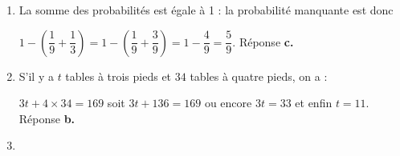 
\medskip

%
 
\begin{enumerate}
\item %



La somme des probabilités est égale à 1  : la probabilité manquante est donc 

$1 - \left(\dfrac{1}{9} + \dfrac{1}{3} \right) = 1 - \left(\dfrac{1}{9} + \dfrac{3}{9} \right) = 1 - \dfrac{4}{9} = \dfrac{5}{9}$. Réponse \textbf{c.} 
\item %
 
S'il y a $t$ tables à trois pieds et $34$ tables à quatre pieds, on a :

$3t + 4 \times 34 = 169$ soit $3t + 136 = 169$ ou encore $3t = 33$ et enfin $t = 11$. Réponse \textbf{b.} 
\medskip
\item %
 

\end{enumerate}
